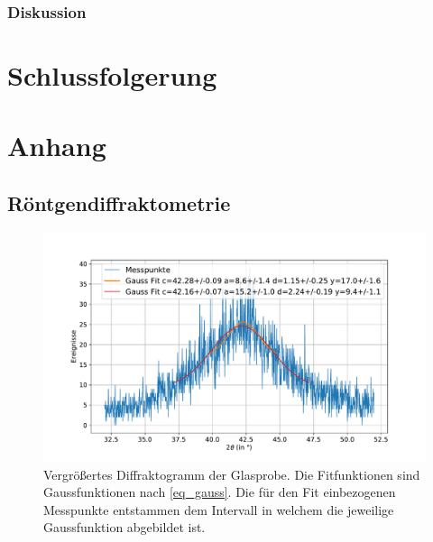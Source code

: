\documentclass[
	a4paper,
	12pt,
	pagesize,
	ngerman
]{scrartcl}
\begin{document}
	\subsubsection{Diskussion}


	\section{Schlussfolgerung}

	\printbibliography



	\section{Anhang} \label{s_anhang}
	\subsection{Röntgendiffraktometrie}

	\begin{figure}[H]
			\includegraphics[width=\linewidth]{img/XRD_Glas_42_10.pdf}
			\caption{
				Vergrößertes Diffraktogramm der Glasprobe.
				Die Fitfunktionen sind Gaussfunktionen nach \cref{eq_gauss}.
				Die für den Fit einbezogenen Messpunkte entstammen dem Intervall in welchem die jeweilige Gaussfunktion abgebildet ist.
				}
			\label{fig_xrd_glas_1}
	\end{figure}
\end{document}
